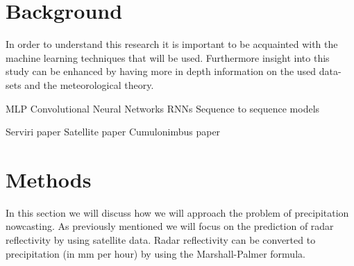 \documentclass[acmtog, authorversion]{acmart}
\begin{document}





\section{Background}
In order to understand this research it is important to be acquainted with the machine learning techniques that will be used. Furthermore insight into this study can be enhanced by having more in depth information on the used data-sets and the meteorological theory.

MLP
Convolutional Neural Networks
RNNs
Sequence to sequence models

Serviri paper
Satellite paper
Cumulonimbus paper

\section{Methods}


In this section we will discuss how we will approach the problem of precipitation nowcasting. As previously mentioned we will focus on the prediction of radar reflectivity by using satellite data. Radar reflectivity can be converted to precipitation (in mm per hour) by using the Marshall-Palmer formula.
\end{document}

